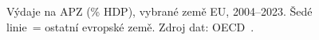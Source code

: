\def\strEuApzVydajeCaption{\centering Výdaje na APZ (\% HDP), vybrané země EU, 2004--2023. Šedé linie~= ostatní evropské země. Zdroj dat: OECD~\cite{oecd_lmpexp_PC_GDP}.}%
%

\providecommand\NudgeEuApzVydajeCz{0pt}%
\providecommand\NudgeEuApzVydajeAt{0pt}%
\providecommand\NudgeEuApzVydajeDe{0pt}%
\providecommand\NudgeEuApzVydajeDk{0pt}%
\providecommand\NudgeEuApzVydajePl{0pt}%
\providecommand\NudgeEuApzVydajeSk{0pt}%
\providecommand\NudgeEuApzVydajeCovid{0pt}%
\begin{figure}[htbp]
  \centering
  \resizebox{0.95\linewidth}{!}{}
  \caption{\strEuApzVydajeCaption}
  \label{fig:eu_apz_vydaje}
\end{figure}
